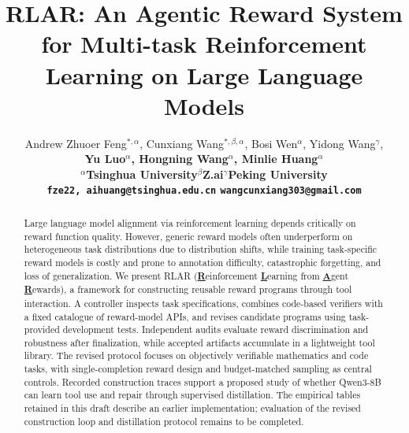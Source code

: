 \documentclass{article}
\title{RLAR: An Agentic Reward System for Multi-task Reinforcement Learning on Large Language Models}
\author{
    Andrew Zhuoer Feng$^{\ast, \alpha}$, 
    Cunxiang Wang$^{\ast, \beta, \alpha}$,
    Bosi Wen$^{\alpha}$,
    Yidong Wang$^{\gamma}$, \\
    \bf Yu Luo$^{\alpha}$,
    Hongning Wang$^{\alpha}$,
    Minlie Huang$^{\alpha}$ \\
    $^\alpha$Tsinghua University\quad $^\beta$Z.ai\quad $^\gamma$Peking University\\
    \texttt{fze22, aihuang@tsinghua.edu.cn} \quad \texttt{wangcunxiang303@gmail.com}
}
\newcommand{\method}[1]{\textsc{RLAR}}
\begin{document}
\maketitle


\begin{abstract}
Large language model alignment via reinforcement learning depends critically on reward function quality. 
However, generic reward models often underperform on heterogeneous task distributions due to distribution shifts, while training task‑specific reward models is costly and prone to annotation difficulty, catastrophic forgetting, and loss of generalization.
We present \method{} (\underline{\textbf{R}}einforcement \underline{\textbf{L}}earning from \underline{\textbf{A}}gent \underline{\textbf{R}}ewards), a framework for constructing reusable reward programs through tool interaction.
A controller inspects task specifications, combines code-based verifiers with a fixed catalogue of reward-model APIs, and revises candidate programs using task-provided development tests.
Independent audits evaluate reward discrimination and robustness after finalization, while accepted artifacts accumulate in a lightweight tool library.
The revised protocol focuses on objectively verifiable mathematics and code tasks, with single-completion reward design and budget-matched sampling as central controls.
Recorded construction traces support a proposed study of whether Qwen3-8B can learn tool use and repair through supervised distillation.
The empirical tables retained in this draft describe an earlier implementation; evaluation of the revised construction loop and distillation protocol remains to be completed.
\end{abstract}
















\appendix


\label{sec:appendix}










\end{document}
